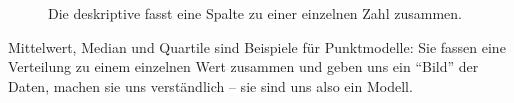 \documentclass[
  letterpaper,
  twoside,
  open=any]{scrbook}
\theoremstyle{definition}
\theoremstyle{definition}
\theoremstyle{definition}
\theoremstyle{remark}
\begin{document}
\begin{figure}


\caption{\label{fig-desk}Die deskriptive fasst eine Spalte zu einer
einzelnen Zahl zusammen.}

\end{figure}%

Mittelwert, Median und Quartile sind Beispiele für Punktmodelle: Sie
fassen eine Verteilung zu einem einzelnen Wert zusammen und geben uns
ein \enquote{Bild} der Daten, machen sie uns verständlich -- sie sind
uns also ein Modell.
\end{document}
